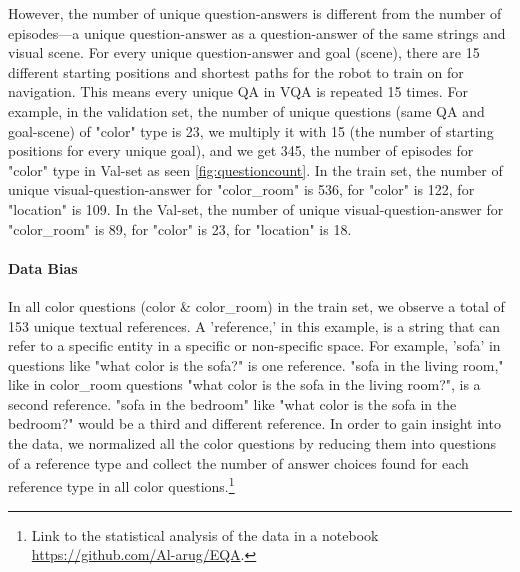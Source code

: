 However, the number of unique question-answers is different from the number of episodes—a unique question-answer as a question-answer of the same strings and visual scene. For every unique question-answer and goal (scene), there are 15 different starting positions and shortest paths for the robot to train on for navigation. This means every unique QA in VQA is repeated 15 times. For example, in the validation set, the number of unique questions (same QA and goal-scene) of "color" type is 23, we multiply it with 15 (the number of starting positions for every unique goal), and we get 345, the number of episodes for "color" type in Val-set as seen \ref{fig:questioncount}. In the train set, the number of unique visual-question-answer for "color\_room" is 536, for "color" is 122, for "location" is 109. In the Val-set, the number of unique visual-question-answer for "color\_room" is 89, for "color" is 23, for "location" is 18. 


\paragraph{Data Bias}

In all color questions (color \& color\_room) in the train set, we observe a total of 153  unique textual references. %
A 'reference,' in this example, is a string that can refer to a specific entity in a specific or non-specific space. For example, 'sofa' in questions like "what color is the sofa?" is one reference. "sofa in the living room," like in color\_room questions "what color is the sofa in the living room?", is a second reference. "sofa in the bedroom" like "what color is the sofa in the bedroom?" would be a third and different reference. In order to gain insight into the data, we normalized %
all the color questions by reducing them into questions of a reference type and collect the number of answer choices found for each reference type in all color questions.\footnote{ Link to the statistical analysis of the data in a notebook  \url{https://github.com/Al-arug/EQA}.} 



